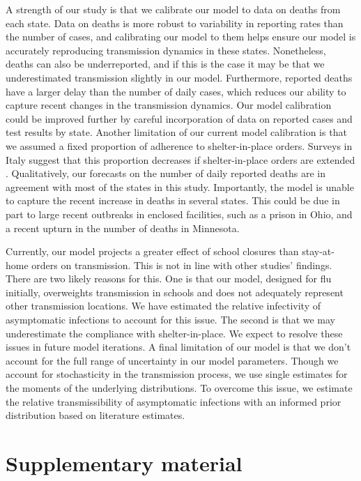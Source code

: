 \documentclass[11pt]{article}
\begin{document}
A strength of our study is that we calibrate our model to data on deaths from each state. Data on deaths is more robust to variability in reporting rates than the number of cases, and calibrating our model to them helps ensure our model is accurately reproducing transmission dynamics in these states. Nonetheless, deaths can also be underreported, and if this is the case it may be that we underestimated transmission slightly in our model. Furthermore, reported deaths have a larger delay than the number of daily cases, which reduces our ability to capture recent changes in the transmission dynamics. Our model calibration could be improved further by careful incorporation of data on reported cases and test results by state. Another limitation of our current model calibration is that we assumed a fixed proportion of adherence to shelter-in-place orders. Surveys in Italy suggest that this proportion decreases if  shelter-in-place orders are extended \cite{Briscese2020_NBER}. Qualitatively, our forecasts on the number of daily reported deaths are in agreement with most of the states in this study. Importantly, the model is unable to capture the recent increase in deaths in several states. This could be due in part to large recent outbreaks in enclosed facilities, such as a prison in Ohio, and a recent upturn in the number of deaths in Minnesota. 

Currently, our model projects a greater effect of school closures than stay-at-home orders on transmission. This is not in line with other studies’ findings. There are two likely reasons for this. One is that our model, designed for flu initially, overweights transmission in schools and does not adequately represent other transmission locations. We have estimated the relative infectivity of asymptomatic infections to account for this issue. The second is that we may underestimate the compliance with shelter-in-place. We expect to resolve these issues in future model iterations. A final limitation of our model is that we don’t account for the full range of uncertainty in our model parameters. Though we account for stochasticity in the transmission process, we use single estimates for the moments of the underlying distributions. To overcome this issue, we estimate the relative transmissibility of asymptomatic infections with an informed prior distribution based on literature estimates. 

\clearpage
\printbibliography


\section*{Supplementary material}
\setcounter{table}{0}
\renewcommand{\thetable}{S\arabic{table}}%
\setcounter{figure}{0}
\renewcommand{\thefigure}{S\arabic{figure}}%
\end{document}
